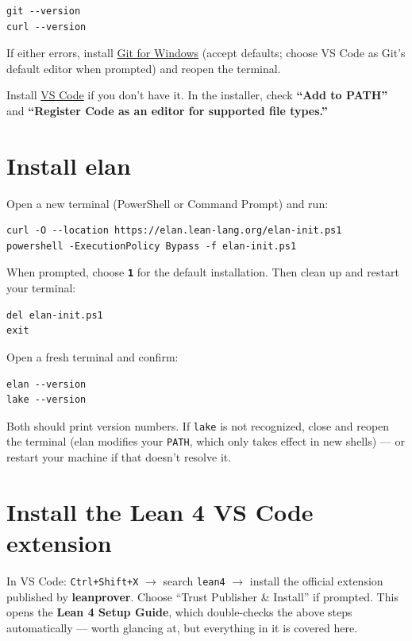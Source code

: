 \begin{verbatim}
git --version
curl --version
\end{verbatim}

If either errors, install \href{https://git-scm.com/download/win}{Git for Windows} (accept defaults; choose VS Code as Git's default editor when prompted) and reopen the terminal.

Install \href{https://code.visualstudio.com/Download}{VS Code} if you don't have it. In the installer, check \textbf{``Add to PATH''} and \textbf{``Register Code as an editor for supported file types.''}

\section{Install elan}

Open a new terminal (PowerShell or Command Prompt) and run:

\begin{verbatim}
curl -O --location https://elan.lean-lang.org/elan-init.ps1
powershell -ExecutionPolicy Bypass -f elan-init.ps1
\end{verbatim}

When prompted, choose \textbf{\texttt{1}} for the default installation. Then clean up and restart your terminal:

\begin{verbatim}
del elan-init.ps1
exit
\end{verbatim}

Open a fresh terminal and confirm:

\begin{verbatim}
elan --version
lake --version
\end{verbatim}

Both should print version numbers. If \texttt{lake} is not recognized, close and reopen the terminal (elan modifies your \texttt{PATH}, which only takes effect in new shells) --- or restart your machine if that doesn't resolve it.

\section{Install the Lean 4 VS Code extension}

In VS Code: \texttt{Ctrl+Shift+X} $\rightarrow$ search \texttt{lean4} $\rightarrow$ install the official extension published by \textbf{leanprover}. Choose ``Trust Publisher \& Install'' if prompted. This opens the \textbf{Lean 4 Setup Guide}, which double-checks the above steps automatically --- worth glancing at, but everything in it is covered here.

